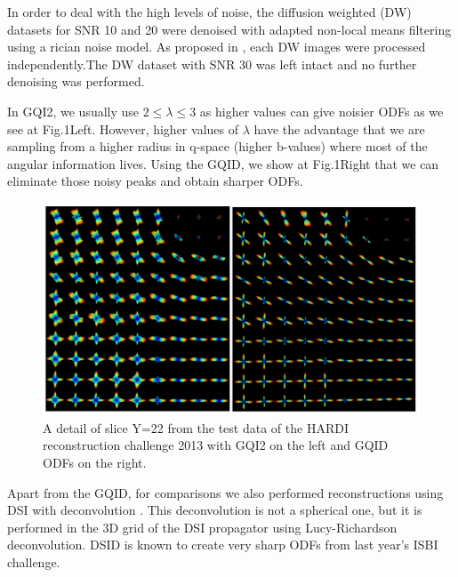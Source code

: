 \documentclass[9pt,conference,a4paper]{IEEEtran}
\begin{document}
In order to deal with the high levels of noise, the diffusion weighted (DW) datasets for SNR 10 and 20 were denoised with adapted non-local means filtering \cite{descoteaux-wiest-daessle-etal:08} using a rician noise model. As proposed in \cite{descoteaux-wiest-daessle-etal:08}, each DW images were processed independently.The DW dataset with SNR 30 was left intact and no further denoising was performed.

In GQI2, we usually use $2\le\lambda\le3$  as higher values can give noisier ODFs as we see at Fig.1Left. However, higher values of $\lambda$ have the advantage that we are sampling from a higher radius in q-space (higher b-values) where most of the angular information lives. Using the GQID, we show at Fig.1Right that we can eliminate those noisy peaks and obtain sharper ODFs.

\begin{figure}[h]
\begin{centering}
\includegraphics[scale=.9]{gqi2_vs_gqid_snr30}
\end{centering}
\caption{A detail of slice Y=22 from the test data of the HARDI reconstruction challenge 2013 with GQI2 on the left and GQID ODFs on the right.}
\end{figure}

Apart from the GQID, for comparisons we also performed reconstructions using DSI with deconvolution \cite{canales-rodriguez-etal:10}. This deconvolution is not a spherical one, but it is performed in the 3D grid of the DSI propagator using Lucy-Richardson deconvolution. DSID is known to create very sharp ODFs from last year's ISBI challenge.

\end{document}
